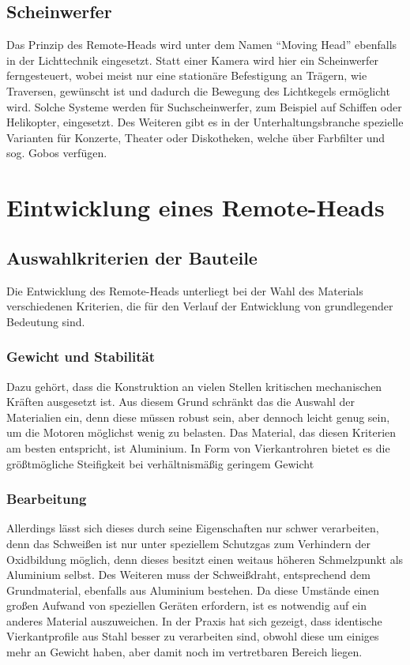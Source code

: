 \documentclass[a4paper, 12pt, bibtotocnumbered, liststotocnumbered]{scrartcl}
\begin{document}
	\subsection{Scheinwerfer}
	Das Prinzip des Remote-Heads wird unter dem Namen “Moving Head” ebenfalls in der Lichttechnik eingesetzt. Statt einer Kamera wird hier ein Scheinwerfer ferngesteuert, wobei meist nur eine stationäre Befestigung an Trägern, wie Traversen, gewünscht ist und dadurch die Bewegung des Lichtkegels ermöglicht wird. Solche Systeme werden für Suchscheinwerfer, zum Beispiel auf Schiffen oder Helikopter, eingesetzt. Des Weiteren gibt es in der Unterhaltungsbranche spezielle Varianten für Konzerte, Theater oder Diskotheken, welche über Farbfilter und sog. Gobos verfügen.

	\section{Eintwicklung eines Remote-Heads}
	\subsection{Auswahlkriterien der Bauteile}
	Die Entwicklung des Remote-Heads unterliegt bei der Wahl des Materials verschiedenen Kriterien, die für den Verlauf der Entwicklung von grundlegender Bedeutung sind.

	\subsubsection{Gewicht und Stabilität}
	Dazu gehört, dass die Konstruktion an vielen Stellen kritischen mechanischen Kräften ausgesetzt ist. Aus diesem Grund schränkt das die Auswahl der Materialien ein, denn diese müssen robust sein, aber dennoch leicht genug sein, um die Motoren möglichst wenig zu belasten. Das Material, das diesen Kriterien am besten entspricht, ist Aluminium. In Form von Vierkantrohren bietet es die größtmögliche Steifigkeit bei verhältnismäßig geringem Gewicht

	\subsubsection{Bearbeitung}
	Allerdings lässt sich dieses durch seine Eigenschaften nur schwer verarbeiten, denn das Schweißen ist nur unter speziellem Schutzgas zum Verhindern der Oxidbildung möglich, denn dieses besitzt einen weitaus höheren Schmelzpunkt als Aluminium selbst. Des Weiteren muss der Schweißdraht, entsprechend dem Grundmaterial, ebenfalls aus Aluminium bestehen. Da diese Umstände einen großen Aufwand von speziellen Geräten erfordern, ist es notwendig auf ein anderes Material auszuweichen. In der Praxis hat sich gezeigt, dass identische Vierkantprofile aus Stahl besser zu verarbeiten sind, obwohl diese um einiges mehr an Gewicht haben, aber damit noch im vertretbaren Bereich liegen.
\end{document}
